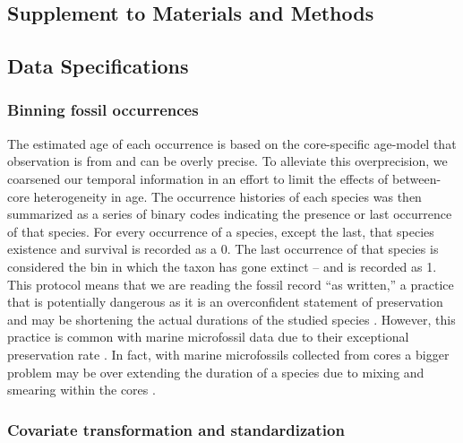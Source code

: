 \documentclass[12pt,letterpaper]{article}
\newcommand{\beginsupplement}{
 \setcounter{section}{0}
 \renewcommand{\thesection}{S\arabic{section}}
 \setcounter{table}{0}
 \renewcommand{\thetable}{S\arabic{table}}
 \setcounter{figure}{0}
 \renewcommand{\thefigure}{S\arabic{figure}}
 \setcounter{equation}{0}
 \renewcommand{\theequation}{S\arabic{equation}}
}
\begin{document}
\beginsupplement
\begin{refsection}


\setcounter{page}{1}
\section{Supplement to Materials and Methods}

\subsection{Data Specifications} \label{sec:data_desc}

\subsubsection{Binning fossil occurrences}

The estimated age of each occurrence is based on the core-specific age-model that observation is from and can be overly precise. To alleviate this overprecision, we coarsened our temporal information in an effort to limit the effects of between-core heterogeneity in age. The occurrence histories of each species was then summarized as a series of binary codes indicating the presence or last occurrence of that species. For every occurrence of a species, except the last, that species existence and survival is recorded as a 0. The last occurrence of that species is considered the bin in which the taxon has gone extinct -- and is recorded as 1. This protocol means that we are reading the fossil record ``as written,'' a practice that is potentially dangerous as it is an overconfident statement of preservation and may be shortening the actual durations of the studied species \citep{Alroy2010,Alroy2000b,Alroy2014,Foote1997,Foote1999a,Foote2001,Foote1996e,Lloyd2012b,Marshall1995,Wang2016}. However, this practice is common with marine microfossil data due to their exceptional preservation rate \citep{Ezard2013,Ezard2016,Ezard2011,Liow2010}. In fact, with marine microfossils collected from cores a bigger problem may be over extending the duration of a species due to mixing and smearing within the cores \citep{Mekik2018,Broecker1999,Mekik2014,Peng1984}.


\subsubsection{Covariate transformation and standardization}


\end{refsection}
\end{document}
